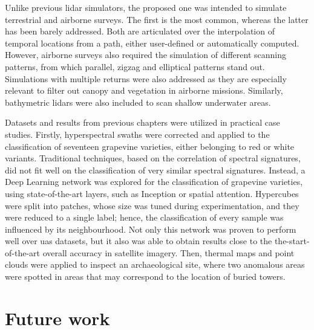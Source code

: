 Unlike previous \acrshort{lidar} simulators, the proposed one was intended to simulate terrestrial and airborne surveys. The first is the most common, whereas the latter has been barely addressed. Both are articulated over the interpolation of temporal locations from a path, either user-defined or automatically computed. However, airborne surveys also required the simulation of different scanning patterns, from which parallel, zigzag and elliptical patterns stand out. Simulations with multiple returns were also addressed as they are especially relevant to filter out canopy and vegetation in airborne missions. Similarly, bathymetric \acrshort{lidar}s were also included to scan shallow underwater areas. 

Datasets and results from previous chapters were utilized in practical case studies. Firstly, hyperspectral swaths were corrected and applied to the classification of seventeen grapevine varieties, either belonging to red or white variants. Traditional techniques, based on the correlation of spectral signatures, did not fit well on the classification of very similar spectral signatures. Instead, a Deep Learning network was explored for the classification of grapevine varieties, using state-of-the-art layers, such as Inception or spatial attention. Hypercubes were split into patches, whose size was tuned during experimentation, and they were reduced to a single label; hence, the classification of every sample was influenced by its neighbourhood. Not only this network was proven to perform well over \acrshort{uas} datasets, but it also was able to obtain results close to the the-start-of-the-art overall accuracy in satellite imagery. Then, thermal maps and point clouds were applied to inspect an archaeological site, where two anomalous areas were spotted in areas that may correspond to the location of buried towers. 

\section{Future work}

